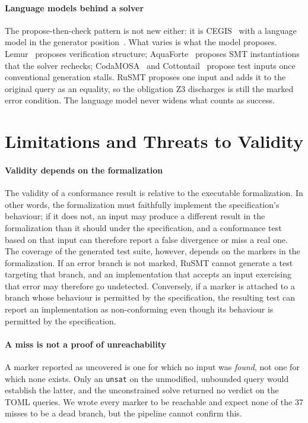 \documentclass[sigconf,screen]{acmart}
\theoremstyle{definition}
\theoremstyle{remark}
\newcommand{\rusmt}{RuSMT}
\newcommand{\toml}{TOML}
\newcommand{\code}[1]{\texttt{#1}}
\newcommand{\misscount}{37}    %
\begin{document}
\paragraph{Language models behind a solver}
The propose-then-check pattern is not new either: it is
CEGIS~\cite{solarlezama2006sketching} with a language model in the generator
position~\cite{jha2023cegisllm}. What varies is what the model proposes.
Lemur~\cite{wu2024lemur} proposes verification structure;
AquaForte~\cite{lv2026aquaforte} proposes SMT instantiations that the solver
rechecks; CodaMOSA~\cite{lemieux2023codamosa} and
Cottontail~\cite{tu2025cottontail} propose test inputs once conventional
generation stalls. \rusmt{} proposes one input and adds it to the original query
as an equality, so the obligation Z3 discharges is still the marked error condition. The language model never widens what counts as success.

\section{Limitations and Threats to Validity}
\label{sec:limits}

\paragraph{Validity depends on the formalization}
The validity of a conformance result is relative to the executable formalization. In other words, the formalization must faithfully implement the specification's behaviour; if it does not, an input may produce a different result in the formalization than it should under the specification, and a conformance test based on that input can therefore report a false divergence or miss a real one. The coverage of the generated test suite, however, depends on the markers in the formalization. If an error branch is not marked, \rusmt{} cannot generate a test targeting that branch, and an implementation that accepts an input exercising that error may therefore go undetected. Conversely, if a marker is attached to a branch whose behaviour is permitted by the specification, the resulting test can report an implementation as non-conforming even though its behaviour is permitted by the specification.

\paragraph{A miss is not a proof of unreachability}
A marker reported as uncovered is one for which no input was \emph{found}, not
one for which none exists. Only an \code{unsat} on the unmodified, unbounded
query would establish the latter, and the unconstrained solve returned no
verdict on the \toml{} queries. We wrote every marker to be reachable and
expect none of the \misscount{} misses to be a dead branch, but the pipeline
cannot confirm this.
\end{document}
